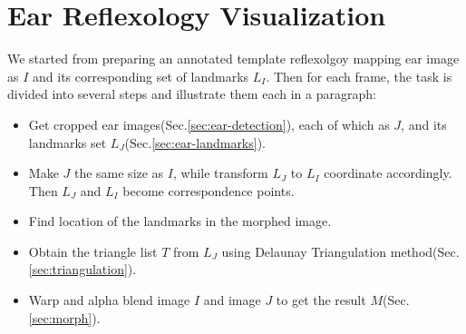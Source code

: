 \section{Ear Reflexology Visualization}
\label{sec:ear-reflexology}
We started from preparing an annotated template reflexolgoy mapping ear image as $I$ and its corresponding set of landmarks $L_I$. Then for each frame, the task is divided into several steps and illustrate them each in a paragraph:
\begin{itemize}
  \item Get cropped ear images(Sec.\ref{sec:ear-detection}), each of which as $J$, and its landmarks set $L_J$(Sec.\ref{sec:ear-landmarks}). 
  \item Make $J$ the same size as $I$, while transform $L_J$ to $L_I$ coordinate accordingly. Then $L_J$ and $L_I$ become correspondence points. 
  \item Find location of the landmarks in the morphed image. 
  \item Obtain the triangle list $T$ from $L_J$ using Delaunay Triangulation method(Sec.\ref{sec:triangulation}). 
  \item Warp and alpha blend image $I$ and image $J$ to get the result $M$(Sec.\ref{sec:morph}).
\end{itemize}

